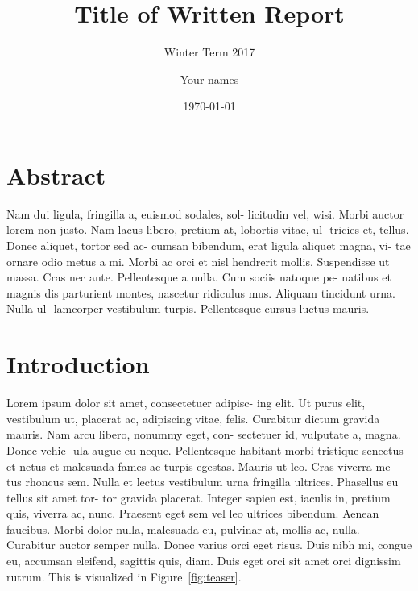 \documentclass{utue} %
\title{Title of Written Report}
\author{Your names}
\date{\today}
\subtitle{Winter Term 2017}
\begin{document}

\maketitle

\section*{Abstract}
Nam dui ligula, fringilla a, euismod sodales, sol-
licitudin vel, wisi. Morbi auctor lorem non justo.
Nam lacus libero, pretium at, lobortis vitae, ul-
tricies et, tellus. Donec aliquet, tortor sed ac-
cumsan bibendum, erat ligula aliquet magna, vi-
tae ornare odio metus a mi. Morbi ac orci et nisl
hendrerit mollis. Suspendisse ut massa. Cras nec
ante. Pellentesque a nulla. Cum sociis natoque pe-
natibus et magnis dis parturient montes, nascetur
ridiculus mus. Aliquam tincidunt urna. Nulla ul-
lamcorper vestibulum turpis. Pellentesque cursus
luctus mauris.

\section{Introduction}
Lorem ipsum dolor sit amet, consectetuer adipisc-
ing elit. Ut purus elit, vestibulum ut, placerat ac,
adipiscing vitae, felis. Curabitur dictum gravida
mauris. Nam arcu libero, nonummy eget, con-
sectetuer id, vulputate a, magna. Donec vehic-
ula augue eu neque. Pellentesque habitant morbi
tristique senectus et netus et malesuada fames ac
turpis egestas. Mauris ut leo. Cras viverra me-
tus rhoncus sem. Nulla et lectus vestibulum urna
fringilla ultrices. Phasellus eu tellus sit amet tor-
tor gravida placerat. Integer sapien est, iaculis in,
pretium quis, viverra ac, nunc. Praesent eget sem
vel leo ultrices bibendum. Aenean faucibus. Morbi
dolor nulla, malesuada eu, pulvinar at, mollis ac,
nulla. Curabitur auctor semper nulla. Donec varius
orci eget risus. Duis nibh mi, congue eu, accumsan
eleifend, sagittis quis, diam. Duis eget orci sit amet
orci dignissim rutrum.
This is visualized in Figure~\ref{fig:teaser}.
\end{document}
